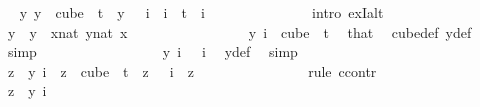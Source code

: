 \begin{isabellebody}
\ \isamarkupfalse%
\ {\isachardoublequoteopen}{\isasymexists}{\isacharbang}{\kern0pt}y{\isachardot}{\kern0pt}\ y\ {\isasymin}\ cube\ {}\ t\ {\isasymand}\ y\ {}\ {\isacharequal}{\kern0pt}\ i{\isachardoublequoteclose}\ \ {\isachardoublequoteopen}i\ {\isacharless}{\kern0pt}\ t{\isachardoublequoteclose}\ \ i\ \isanewline
\ \ \ \ \ \ \ \ \ \ \ \ \isamarkupfalse%
\ {\isacharparenleft}{\kern0pt}intro\ ex{}I{\isacharunderscore}{\kern0pt}alt{\isacharparenright}{\kern0pt}\isanewline
\ \ \ \ \ \ \ \ \ \ \ \ \ \ \isamarkupfalse%
\ y\ \ {\isachardoublequoteopen}y\ {\isasymequiv}\ {\isacharparenleft}{\kern0pt}{\isasymlambda}x{\isacharcolon}{\kern0pt}{\isacharcolon}{\kern0pt}nat{\isachardot}{\kern0pt}\ {\isasymlambda}y{\isasymin}{\isacharbraceleft}{\kern0pt}{\isachardot}{\kern0pt}{\isachardot}{\kern0pt}{\isacharless}{\kern0pt}{}{\isacharcolon}{\kern0pt}{\isacharcolon}{\kern0pt}nat{\isacharbraceright}{\kern0pt}{\isachardot}{\kern0pt}\ x{\isacharparenright}{\kern0pt}{\isachardoublequoteclose}\ \isanewline
\ \ \ \ \ \ \ \ \ \ \ \ \ \ \isamarkupfalse%
\ {\isachardoublequoteopen}y\ i\ {\isasymin}\ {\isacharparenleft}{\kern0pt}cube\ {}\ t{\isacharparenright}{\kern0pt}{\isachardoublequoteclose}\ \isamarkupfalse%
\ that\ \isamarkupfalse%
\ cube{\isacharunderscore}{\kern0pt}def\ y{\isacharunderscore}{\kern0pt}def\ \isamarkupfalse%
\ simp\isanewline
\ \ \ \ \ \ \ \ \ \ \ \ \ \ \isamarkupfalse%
\ \isamarkupfalse%
\ {\isachardoublequoteopen}y\ i\ {}\ {\isacharequal}{\kern0pt}\ i{\isachardoublequoteclose}\ \isamarkupfalse%
\ y{\isacharunderscore}{\kern0pt}def\ \isamarkupfalse%
\ simp\isanewline
\ \ \ \ \ \ \ \ \ \ \ \ \ \ \isamarkupfalse%
\ \isamarkupfalse%
\ {\isachardoublequoteopen}z\ {\isacharequal}{\kern0pt}\ y\ i{\isachardoublequoteclose}\ \ {\isachardoublequoteopen}z\ {\isasymin}\ cube\ {}\ t{\isachardoublequoteclose}\ \ {\isachardoublequoteopen}z\ {}\ {\isacharequal}{\kern0pt}\ i{\isachardoublequoteclose}\ \ z\isanewline
\ \ \ \ \ \ \ \ \ \ \ \ \ \ \isamarkupfalse%
\ {\isacharparenleft}{\kern0pt}rule\ ccontr{\isacharparenright}{\kern0pt}\isanewline
\ \ \ \ \ \ \ \ \ \ \ \ \ \ \ \ \isamarkupfalse%
\ {\isachardoublequoteopen}z\ {\isasymnoteq}\ y\ i{\isachardoublequoteclose}\ \isanewline

\end{isabellebody}
